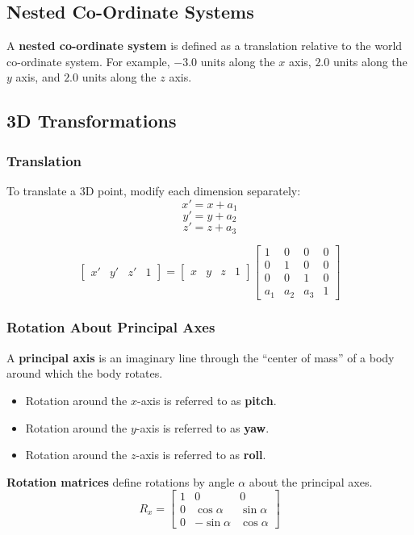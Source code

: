 \documentclass[a4paper,11pt]{article}
\begin{document}
\subsection{Nested Co-Ordinate Systems}
A \textbf{nested co-ordinate system} is defined as a translation relative to the world co-ordinate system.
For example, $-3.0$ units along the $x$ axis, $2.0$ units along the $y$ axis, and $2.0$ units along the $z$ axis.

\subsection{3D Transformations}
\subsubsection{Translation}
To translate a 3D point, modify each dimension separately:
$$
x' = x + a_1
$$
$$
y' = y + a_2
$$
$$
z' = z + a_3
$$

$$
\begin{bmatrix}
    x' & y' & z' & 1
\end{bmatrix}
=
\begin{bmatrix}
    x & y & z & 1
\end{bmatrix}
\begin{bmatrix}
    1   & 0 & 0 & 0 \\
    0   & 1 & 0 & 0 \\
    0   & 0 & 1 & 0 \\
    a_1 & a_2 & a_3 & 1
\end{bmatrix}
$$

\subsubsection{Rotation About Principal Axes}
A \textbf{principal axis} is an imaginary line through the ``center of mass'' of a body around which the body 
rotates.
\begin{itemize}
    \item   Rotation around the $x$-axis is referred to as \textbf{pitch}.
    \item   Rotation around the $y$-axis is referred to as \textbf{yaw}.
    \item   Rotation around the $z$-axis is referred to as \textbf{roll}.
\end{itemize}

\textbf{Rotation matrices} define rotations by angle $\alpha$ about the principal axes.
$$
R_x =
\begin{bmatrix}
    1 & 0 & 0 \\
    0 & \cos \alpha & \sin \alpha \\
    0 & - \sin \alpha & \cos \alpha
\end{bmatrix}
$$
\end{document}
